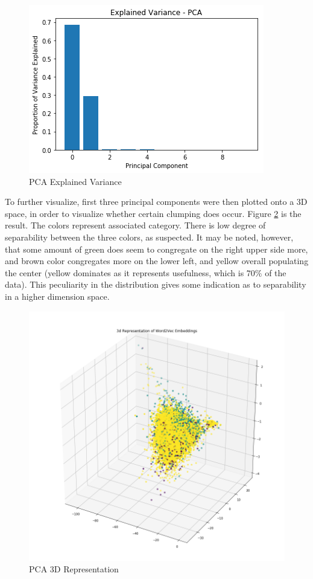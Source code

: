 \documentclass[letterpaper, 12 pt, conference]{ieeeconf}  %
\begin{document}
\begin{figure}[h]
	\centering
	\includegraphics[scale=0.53]{pca_var.png}
	\caption{PCA Explained Variance}
	\label{pca_var}
\end{figure}

To further visualize, first three principal components were then plotted onto a 3D space, in order to visualize whether certain clumping does occur. Figure \ref{w2v_3d} is the result. The colors represent associated category. There is low degree of separability between the three colors, as suspected. It may be noted, however, that some amount of green does seem to congregate on the right upper side more, and brown color congregates more on the lower left, and yellow overall populating the center (yellow dominates as it represents usefulness, which is $70\%$ of the data). This peculiarity in the distribution gives some indication as to separability in a higher dimension space. \\

\begin{figure}[h]
	\centering
	\includegraphics[scale=0.25]{word2vec_3d.png}
	\caption{PCA 3D Representation}
    \label{w2v_3d}
\end{figure}
\end{document}
